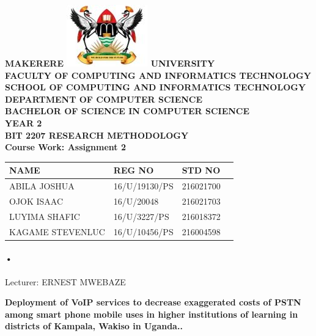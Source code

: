 \documentclass[12pt]{article}
\begin{document}
\begin{Huge}
\begin{center}
\begin{normalsize}
\textbf{MAKERERE \includegraphics[scale=0.5]{logo} UNIVERSITY }\\


\textbf{FACULTY OF COMPUTING AND INFORMATICS TECHNOLOGY} \\
\textbf{SCHOOL OF COMPUTING AND INFORMATICS TECHNOLOGY} \\
\textbf{DEPARTMENT OF COMPUTER SCIENCE} \\
\textbf{BACHELOR OF SCIENCE IN COMPUTER SCIENCE} \\
\textbf{YEAR 2} \\
\textbf{BIT 2207 RESEARCH METHODOLOGY} \\
\textbf{Course Work: Assignment 2}\\
\end{normalsize}
\end{center}
\end{Huge}

\begin{center}
\begin{tabular}{|l|l|l|c|}
\hline NAME  & REG NO & STD NO \\\hline
ABILA JOSHUA& 16/U/19130/PS & 216021700 \\\hline
OJOK ISAAC& 16/U/20048& 216021703 \\\hline
LUYIMA SHAFIC& 16/U/3227/PS	 & 216018372 \\\hline
KAGAME STEVENLUC&16/U/10456/PS  & 216004598\\\hline
\end{tabular}

\paragraph{•}
Lecturer: ERNEST MWEBAZE \\


\end{center}

\newpage

\begin{center}
\textbf{\sc Deployment of VoIP services to decrease exaggerated costs of PSTN among smart phone mobile uses in higher institutions of learning in districts of Kampala, Wakiso in Uganda..}\\
\end{center}
\end{document}
